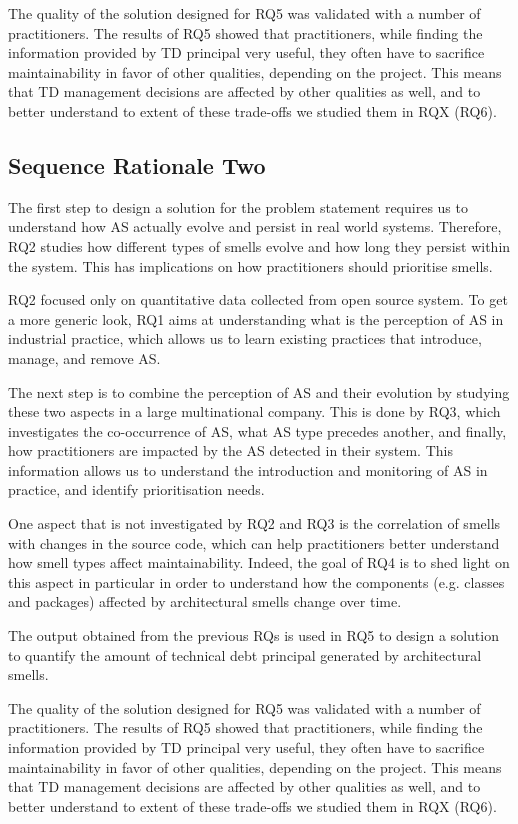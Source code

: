 The quality of the solution designed for RQ5 was validated with a number of practitioners.
The results of RQ5 showed that practitioners, while finding the information provided by TD principal very useful, they often have to sacrifice maintainability in favor of other qualities, depending on the project.
This means that TD management decisions are affected by other qualities as well, and to better understand to extent of these trade-offs we studied them in RQX (RQ6).


\subsection{Sequence Rationale Two}
The first step to design a solution for the problem statement requires us to understand how AS actually evolve and persist in real world systems.
Therefore, RQ2 studies how different types of smells evolve and how long they persist within the system. This has implications on how practitioners should prioritise smells.

RQ2 focused only on quantitative data collected from open source system. To get a more generic look, RQ1 aims at understanding what is the perception of AS in industrial practice, which allows us to learn existing practices that introduce, manage, and remove AS.

The next step is to combine the perception of AS and their evolution by studying these two aspects in a large multinational company.
This is done by RQ3, which investigates the co-occurrence of AS, what AS type precedes another, and finally, how practitioners are impacted by the AS detected in their system.
This information allows us to understand the introduction and monitoring of AS in practice, and identify prioritisation needs.
 
One aspect that is not investigated by RQ2 and RQ3 is the correlation of smells with changes in the source code, which can help practitioners better understand how smell types affect maintainability. Indeed, the goal of RQ4 is to shed light on this aspect in particular in order to understand how the components (e.g. classes and packages) affected by architectural smells change over time.

The output obtained from the previous RQs is used in RQ5 to design a solution to quantify the amount of technical debt principal generated by architectural smells.

The quality of the solution designed for RQ5 was validated with a number of practitioners.
The results of RQ5 showed that practitioners, while finding the information provided by TD principal very useful, they often have to sacrifice maintainability in favor of other qualities, depending on the project.
This means that TD management decisions are affected by other qualities as well, and to better understand to extent of these trade-offs we studied them in RQX (RQ6).
 
